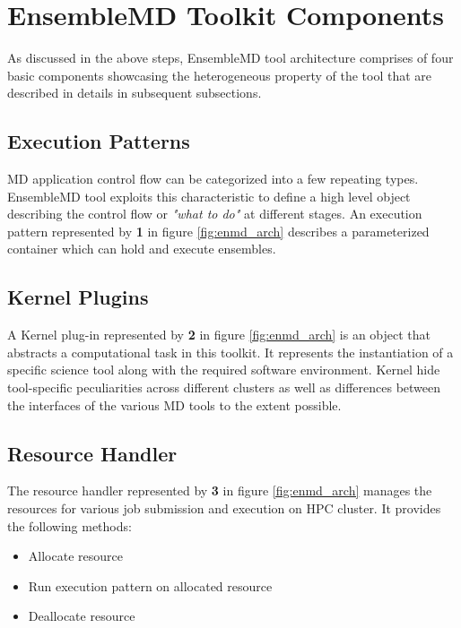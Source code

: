 \documentclass[10pt]{ruthesis}
\begin{document}
\section{EnsembleMD Toolkit Components}
As discussed in the above steps, EnsembleMD tool architecture comprises of four basic components showcasing the heterogeneous property of the tool that are described in details in subsequent subsections.

\subsection{Execution Patterns}
MD application control flow can be categorized into a few repeating types. EnsembleMD tool exploits this characteristic to define a high level object describing the control flow or {\em"what to do"} at different stages. An execution pattern represented by \textbf{{1}} in figure \ref{fig:enmd_arch} describes a parameterized container which can hold and execute ensembles. 

\subsection{Kernel Plugins}
A Kernel plug-in represented by \textbf{{2}} in figure \ref{fig:enmd_arch} is an object that abstracts a computational task in this toolkit. It represents the instantiation of a specific science tool along with the required software environment. Kernel hide tool-specific peculiarities across different clusters as well as differences between the interfaces of the various MD tools to the extent possible. 

\subsection{Resource Handler}
The resource handler represented by \textbf{{3}} in figure \ref{fig:enmd_arch} manages the resources for various job submission and execution on HPC cluster. It provides the following methods:
\begin{itemize}
	\item Allocate resource
	\item Run execution pattern on allocated resource
	\item Deallocate resource
\end{itemize}
\end{document}
